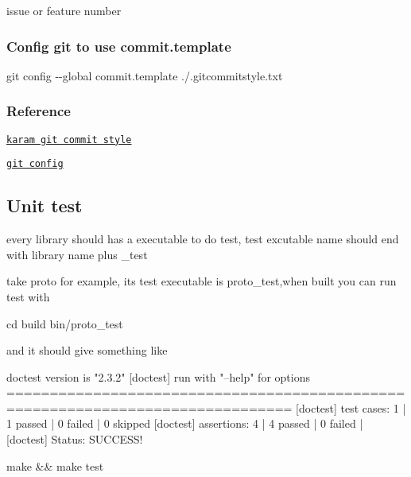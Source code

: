 issue or feature number

\subsubsection*{Config git to use {\ttfamily commit.\+template}}

{\ttfamily git config -\/-\/global commit.\+template ./.gitcommitstyle.\+txt}

\subsubsection*{Reference}


\begin{DoxyItemize}
\item \href{http://karma-runner.github.io/4.0/dev/git-commit-msg.html}{\tt karam git commit style}
\item \href{https://git-scm.com/book/en/v2/Customizing-Git-Git-Configuration}{\tt git config}
\end{DoxyItemize}

\subsection*{Unit test}

every library should has a executable to do test, test excutable name should end with library name plus {\ttfamily \+\_\+test}

take {\ttfamily proto} for example, its test executable is {\ttfamily proto\+\_\+test},when built you can run test with


\begin{DoxyCode}
cd build
bin/proto\_test
\end{DoxyCode}


and it should give something like


\begin{DoxyCode}
[doctest] doctest version is "2.3.2"
[doctest] run with "--help" for options
===============================================================================
[doctest] test cases:      1 |      1 passed |      0 failed |      0 skipped
[doctest] assertions:      4 |      4 passed |      0 failed |
[doctest] Status: SUCCESS!
\end{DoxyCode}


{\ttfamily make \&\& make test}




